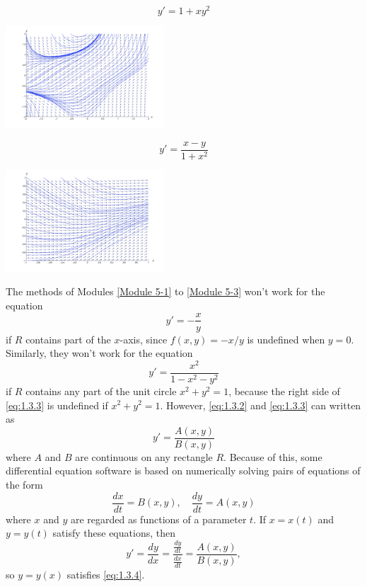 \documentclass{ximera}
\begin{document}
\begin{example}\label{ex:fig010303}
$$
y'=1+xy^2
$$
\begin{image}
  \includegraphics[height=1.5in]{fig010303.jpg}
\end{image}
\end{example}
\begin{example}\label{ex:fig010304}
$$
y'=\frac{x-y}{1+x^2}
$$
\begin{image}
   \includegraphics[height=1.5in]{fig010304.jpg}
\end{image}
\end{example}
The methods of Modules \ref{Module 5-1} to \ref{Module 5-3} won't work for the equation
\begin{equation} \label{eq:1.3.2}
y'=-\frac{x}{y}
\end{equation}
if $R$ contains part of the $x$-axis, since $f(x,y)=-x/y$ is undefined
when $y=0$. Similarly, they won't work for the equation
\begin{equation} \label{eq:1.3.3}
y'=\frac{x^2}{1-x^2-y^2}
\end{equation}
if $R$ contains any part of the unit circle $x^2+y^2=1$, because the
right side of \eqref{eq:1.3.3} is undefined if $x^2+y^2=1$. However,
\eqref{eq:1.3.2} and \eqref{eq:1.3.3} can written as
\begin{equation} \label{eq:1.3.4}
y'=\frac{A(x,y)}{B(x,y)}
\end{equation}
where $A$ and $B$ are  continuous on any rectangle $R$. Because of
this,
some differential equation software is based on
numerically solving pairs of equations of the form
\begin{equation} \label{eq:1.3.5}
\frac{dx}{dt}=B(x,y),\quad \frac{dy}{dt}=A(x,y)
\end{equation}
where $x$ and $y$ are regarded as functions of a parameter $t$.
If $x=x(t)$ and $y=y(t)$  satisfy these equations, then
$$
y'=\frac{dy}{dx}=\frac{\frac{dy}{dt}}{\frac{dx}{dt}}=\frac{A(x,y)}{B(x,y)},
$$
so $y=y(x)$ satisfies \eqref{eq:1.3.4}.
\end{document}
